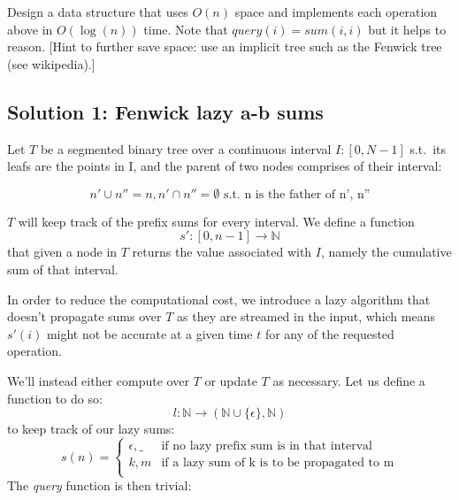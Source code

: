 \documentclass{article}
\begin{document}
Design a data structure that uses $O(n)$ space and implements each operation above
in $O(\log(n))$ time. Note that $query(i) = sum(i, i)$ but it helps to reason.
[Hint to further save space: use an implicit tree such as the Fenwick tree (see wikipedia).]

\subsection{Solution 1: Fenwick lazy a-b sums}
Let $T$ be a segmented binary tree over a continuous interval $I: [0, N - 1]$
s.t.\ its leafs are the points in I, and the parent of two nodes comprises of their interval:

\begin{equation*}
  n' \cup n'' = n, n' \cap n'' = \emptyset   \textrm{ s.t. n is the father of n', n''}
\end{equation*}

$T$ will keep track of the prefix sums for every interval.
We define a function
\begin{equation}
    s': [0, n - 1] \to \mathbb{N}
\end{equation}
that given a node in $T$ returns the value associated with $I$, namely the
cumulative sum of that interval.

In order to reduce the computational cost, we introduce a lazy algorithm
that doesn't propagate sums over $T$ as they are streamed in the input,
which means $s'(i)$ might not be accurate at a given time $t$ for any of the
requested operation.

We'll instead either compute over $T$ or update $T$ as necessary.
Let us define a function to do so:
\begin{equation}
    l: \mathbb{N} \to (\mathbb{N} \cup \{\epsilon\}, \mathbb{N})
\end{equation}
to keep track of our lazy sums:
\begin{equation*}
    s(n) = \begin{cases}
            \epsilon, \_            &   \textrm{if no lazy prefix sum is in that interval} \\
            k, m                    &   \textrm{if a lazy sum of k is to be propagated to m}\\
            \end{cases}
\end{equation*}
The \emph{query} function is then trivial:
\end{document}
